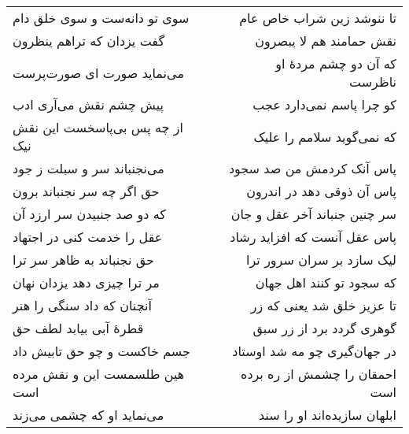 \begin{center}
\begin{longtable}{l p{0.5cm} r}
سوی تو دانه‌ست و سوی خلق دام
&&
تا ننوشد زین شراب خاص عام
\\
گفت یزدان که تراهم ینظرون
&&
نقش حمامند هم لا یبصرون
\\
می‌نماید صورت ای صورت‌پرست
&&
که آن دو چشم مردهٔ او ناظرست
\\
پیش چشم نقش می‌آری ادب
&&
کو چرا پاسم نمی‌دارد عجب
\\
از چه پس بی‌پاسخست این نقش نیک
&&
که نمی‌گوید سلامم را علیک
\\
می‌نجنباند سر و سبلت ز جود
&&
پاس آنک کردمش من صد سجود
\\
حق اگر چه سر نجنباند برون
&&
پاس آن ذوقی دهد در اندرون
\\
که دو صد جنبیدن سر ارزد آن
&&
سر چنین جنباند آخر عقل و جان
\\
عقل را خدمت کنی در اجتهاد
&&
پاس عقل آنست که افزاید رشاد
\\
حق نجنباند به ظاهر سر ترا
&&
لیک سازد بر سران سرور ترا
\\
مر ترا چیزی دهد یزدان نهان
&&
که سجود تو کنند اهل جهان
\\
آنچنان که داد سنگی را هنر
&&
تا عزیز خلق شد یعنی که زر
\\
قطرهٔ آبی بیابد لطف حق
&&
گوهری گردد برد از زر سبق
\\
جسم خاکست و چو حق تابیش داد
&&
در جهان‌گیری چو مه شد اوستاد
\\
هین طلسمست این و نقش مرده است
&&
احمقان را چشمش از ره برده است
\\
می‌نماید او که چشمی می‌زند
&&
ابلهان سازیده‌اند او را سند
\\
\end{longtable}
\end{center}
